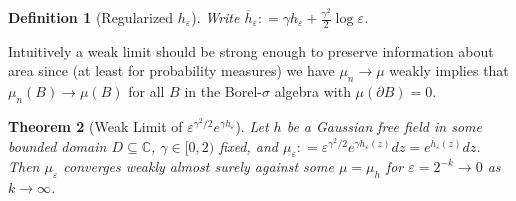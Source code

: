 \documentclass[11pt,reqno]{amsart}
\numberwithin{equation}{section}
\newtheorem{thm}{Theorem}[section]
\newtheorem{defi}[thm]{Definition}
\newcommand{\deq}{\mathrel{\mathop:}=}
\newcommand{\eps}{\varepsilon}
\begin{document}
\begin{defi}[Regularized $h_\eps$]
	Write $\overline h_\eps\deq \gamma h_\eps+\frac{\gamma^2}{2}\log\eps$.
\end{defi}


Intuitively a weak limit should be strong enough to preserve information about area since (at least for probability measures) we have $\mu_n\rightarrow\mu$ weakly implies that $\mu_n(B)\rightarrow\mu(B)$ for all $B$ in the Borel-$\sigma$ algebra with $\mu(\partial B)=0$.

\begin{thm}[Weak Limit of $\eps^{\gamma^2/2}e^{\gamma h_\eps}$]
	Let $h$ be a Gaussian free field in some bounded domain $D\subseteq\mathbb C$, $\gamma \in [0,2)$ fixed, and $\mu_\eps\deq\eps^{\gamma^2/2}e^{\gamma h_\eps(z)}dz = e^{\overline h_\eps(z)}dz$. Then $\mu_\eps$ converges weakly almost surely against some $\mu=\mu_h$ for $\eps=2^{-k}\rightarrow 0$ as $k\rightarrow \infty$.
\end{thm}
\end{document}
